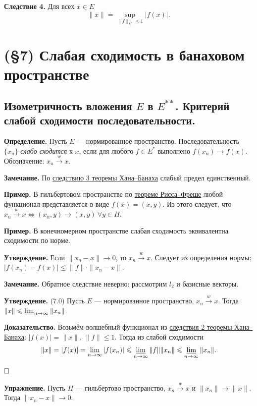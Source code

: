 \documentclass[12pt, a4paper]{article}
\newcommand{\QED}{$\hfill\square$}
\renewcommand{\le}{\leqslant}  %
\begin{document}
 \label{th:hahn-banach-coll-4} \textbf{Следствие 4.}
Для всех $x \in E$
\[
    \|x\| = \sup_{\|f\|_{E^*} \le 1} |f(x)|.
\]

\section{(§7) Слабая сходимость в банаховом пространстве}

\subsection{Изометричность вложения \texorpdfstring{$E$}{E} в \texorpdfstring{$E^{**}$}{E**}. Критерий слабой сходимости последовательности.}

\textbf{Определение.} Пусть $E$ --- нормированное пространство.
Последовательность $\{x_n\}$ \textit{слабо сходится} к $x$, если для любого $f \in E^*$ выполнено $f(x_n) \to f(x)$. Обозначение: $x_n \xrightarrow{w} x$.

\textbf{Замечание.} По \hyperref[th:hahn-banach-coll-3]{следствию 3 теоремы Хана--Банаха} слабый предел единственный.

\textbf{Пример.} В гильбертовом пространстве по \hyperref[th:6-1]{теореме Рисса--Фреше} любой функционал представляется в виде $f(x) = (x, y)$.
Из этого следует, что $x_n \xrightarrow{w} x \iff (x_n, y) \to (x, y)~\forall y \in H$.

\textbf{Пример.} В конечномерном пространстве слабая сходимость эквивалентна сходимости по норме.

\textbf{Утверждение.} Если $\|x_n - x\| \to 0$, то $x_n \xrightarrow{w} x$.
Следует из определения нормы: $|f(x_n) - f(x)| \le \|f\| \cdot \|x_n - x\|$.

\textbf{Замечание.} Обратное следствие неверно: рассмотрим $l_2$ и базисные векторы.

 \label{th:7-0} \textbf{Утверждение.} (7.0) Пусть $E$ --- нормированное пространство, $x_n \xrightarrow{w} x$. Тогда \\ $\|x\| \le \varliminf_{n \to \infty}\|x_n\|$.

\textbf{Доказательство.} Возьмём волшебный функционал из \hyperref[th:hahn-banach-coll-2]{следствия 2 теоремы Хана--Банаха}: $|f(x)| = \|x\|$, $\|f\| \le 1$. Тогда из слабой сходимости
\[
    \|x\| = |f(x)| = \lim_{n\to\infty}|f(x_n)| \le \varliminf_{n \to \infty}\|f\|\|x_n\| \le \varliminf_{n \to \infty}\|x_n\|.
\]

\QED

\textbf{Упражнение.} Пусть $H$ --- гильбертово пространство, $x_n \xrightarrow{w} x$ и $\|x_n\| \to \|x\|$.
Тогда $\|x_n - x\| \to 0$.
\end{document}
